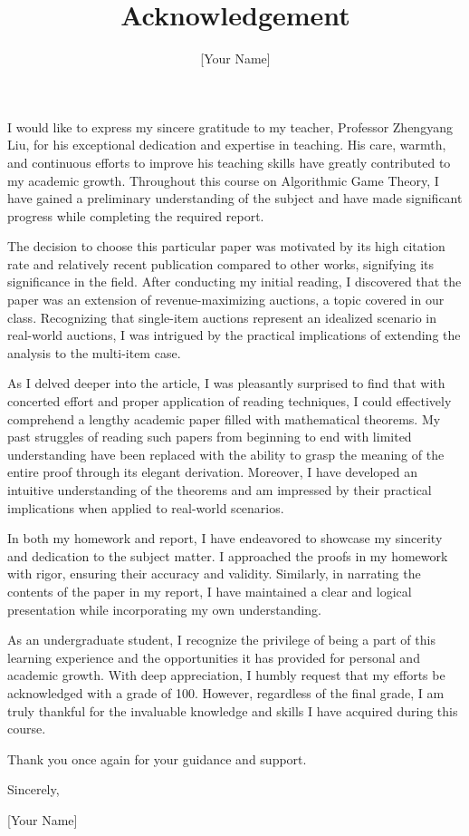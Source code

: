 \documentclass{article}
\begin{document}
\title{Acknowledgement}
\author{[Your Name]}
\date{}

\maketitle

I would like to express my sincere gratitude to my teacher, Professor Zhengyang Liu, for his exceptional dedication and expertise in teaching. His care, warmth, and continuous efforts to improve his teaching skills have greatly contributed to my academic growth. Throughout this course on Algorithmic Game Theory, I have gained a preliminary understanding of the subject and have made significant progress while completing the required report.

The decision to choose this particular paper was motivated by its high citation rate and relatively recent publication compared to other works, signifying its significance in the field. After conducting my initial reading, I discovered that the paper was an extension of revenue-maximizing auctions, a topic covered in our class. Recognizing that single-item auctions represent an idealized scenario in real-world auctions, I was intrigued by the practical implications of extending the analysis to the multi-item case.

As I delved deeper into the article, I was pleasantly surprised to find that with concerted effort and proper application of reading techniques, I could effectively comprehend a lengthy academic paper filled with mathematical theorems. My past struggles of reading such papers from beginning to end with limited understanding have been replaced with the ability to grasp the meaning of the entire proof through its elegant derivation. Moreover, I have developed an intuitive understanding of the theorems and am impressed by their practical implications when applied to real-world scenarios.

In both my homework and report, I have endeavored to showcase my sincerity and dedication to the subject matter. I approached the proofs in my homework with rigor, ensuring their accuracy and validity. Similarly, in narrating the contents of the paper in my report, I have maintained a clear and logical presentation while incorporating my own understanding.

As an undergraduate student, I recognize the privilege of being a part of this learning experience and the opportunities it has provided for personal and academic growth. With deep appreciation, I humbly request that my efforts be acknowledged with a grade of 100. However, regardless of the final grade, I am truly thankful for the invaluable knowledge and skills I have acquired during this course.

Thank you once again for your guidance and support.

Sincerely,

[Your Name]
\end{document}
